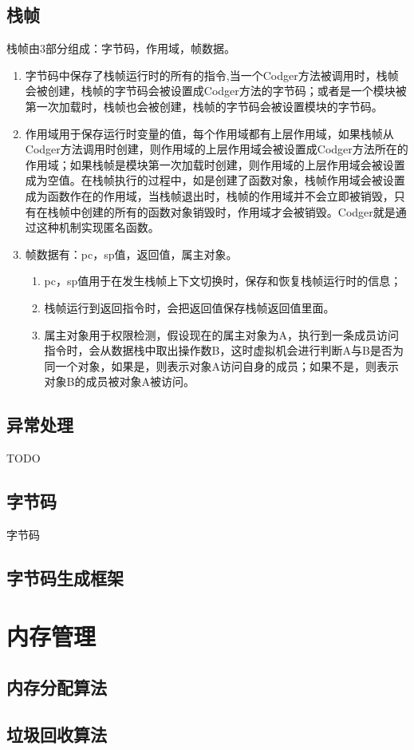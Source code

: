 \documentclass[a4paper,10pt]{article}
\begin{document}
\begin{CJK}{UTF8}{gbsn}
\subsection{栈帧}
栈帧由3部分组成：字节码，作用域，帧数据。
\begin{enumerate}
\item 字节码中保存了栈帧运行时的所有的指令,当一个Codger方法被调用时，栈帧会被创建，栈帧的字节码会被设置成Codger方法的字节码；或者是一个模块被第一次加载时，栈帧也会被创建，栈帧的字节码会被设置模块的字节码。
\item 作用域用于保存运行时变量的值，每个作用域都有上层作用域，如果栈帧从Codger方法调用时创建，则作用域的上层作用域会被设置成Codger方法所在的作用域；如果栈帧是模块第一次加载时创建，则作用域的上层作用域会被设置成为空值。在栈帧执行的过程中，如是创建了函数对象，栈帧作用域会被设置成为函数作在的作用域，当栈帧退出时，栈帧的作用域并不会立即被销毁，只有在栈帧中创建的所有的函数对象销毁时，作用域才会被销毁。Codger就是通过这种机制实现匿名函数。
\item 帧数据有：pc，sp值，返回值，属主对象。
\begin{enumerate}
\item pc，sp值用于在发生栈帧上下文切换时，保存和恢复栈帧运行时的信息；
\item 栈帧运行到返回指令时，会把返回值保存栈帧返回值里面。
\item 属主对象用于权限检测，假设现在的属主对象为A，执行到一条成员访问指令时，会从数据栈中取出操作数B，这时虚拟机会进行判断A与B是否为同一个对象，如果是，则表示对象A访问自身的成员；如果不是，则表示对象B的成员被对象A被访问。
\end{enumerate}
\end{enumerate}
\subsection{异常处理}
TODO
\subsection{字节码}
字节码


\subsection{字节码生成框架}
\section{内存管理}
\subsection{内存分配算法}
\subsection{垃圾回收算法}

\end{CJK}
\end{document}
